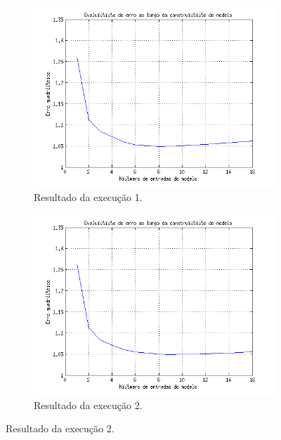 \FloatBarrier
\begin{figure}[H] 
				
			\centering
			
				\begin{subfigure}{.5\textwidth}
				  \centering
				  \includegraphics[width=1\linewidth]{image/forward1_2}
				  \caption{Resultado da execução 1.}
				  \label{forward1_2}
				\end{subfigure}%
				\begin{subfigure}{.5\textwidth}
				  \centering
				  \includegraphics[width=1\linewidth]{image/forward2_2}
				  \caption{Resultado da execução 2.}
				  \label{forward2_2}
			\end{subfigure}
			

\end{figure}
